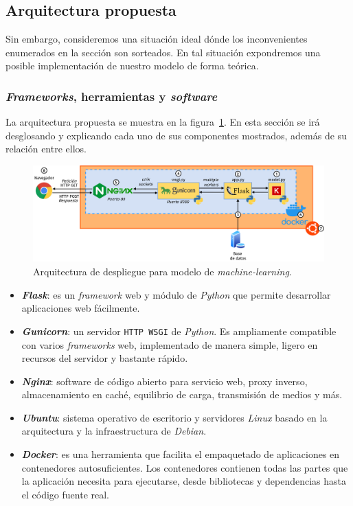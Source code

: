 \documentclass[a4paper,12pt]{article}
\begin{document}
		\subsection{Arquitectura propuesta}\label{section:architectureai}
		
		Sin embargo, consideremos una situación ideal dónde los inconvenientes enumerados en la sección \label{problems} son sorteados. En tal situación expondremos una posible implementación de nuestro modelo de forma teórica.
		
		\subsubsection{\textit{Frameworks}, herramientas y \textit{software}}
		
		La arquitectura propuesta se muestra en la figura~\ref{fig:en_fsi}. En esta sección se irá desglosando y explicando cada uno de sus componentes mostrados, además de su relación entre ellos.\citep{Chinchure2020May}
		
		\begin{figure}[H]
			\begin{center}
				\includegraphics[width=1\textwidth]{deploy_model.png}
				\caption{Arquitectura de despliegue para modelo de \textit{machine-learning}.}
				\label{fig:en_fsi}
			\end{center}
		\end{figure}
		
		\begin{itemize}
			\item \textit{\textbf{Flask}}: es un \textit{framework} web y módulo de \textit{Python} que permite desarrollar aplicaciones web fácilmente. \citep{flask}
			\item \textit{\textbf{Gunicorn}}: un servidor \texttt{HTTP WSGI} de \textit{Python}. Es ampliamente compatible con varios \textit{frameworks} web, implementado de manera simple, ligero en recursos del servidor y bastante rápido. \citep{gunicorn}
			\item \textit{\textbf{Nginx}}: software de código abierto para servicio web, proxy inverso, almacenamiento en caché, equilibrio de carga, transmisión de medios y más. \citep{nginx}
			\item \textit{\textbf{Ubuntu}}: sistema operativo de escritorio y servidores \textit{Linux} basado en la arquitectura y la infraestructura de \textit{Debian}. \citep{ubuntu}
			\item \textit{\textbf{Docker}}: es una herramienta que facilita el empaquetado de aplicaciones en contenedores autosuficientes. Los contenedores contienen todas las partes que la aplicación necesita para ejecutarse, desde bibliotecas y dependencias hasta el código fuente real. \citep{docker}
		\end{itemize}
		
\end{document}
